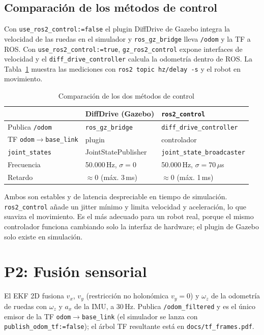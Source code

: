 \documentclass[conference,a4paper]{IEEEtran}
\begin{document}
\subsection{Comparación de los métodos de control}
Con \texttt{use\_ros2\_control:=false} el plugin DiffDrive de Gazebo integra la velocidad de las ruedas en el simulador y \texttt{ros\_gz\_bridge} lleva \texttt{/odom} y la TF a ROS. Con \texttt{use\_ros2\_control:=true}, \texttt{gz\_ros2\_control} expone interfaces de velocidad y el \texttt{diff\_drive\_controller} calcula la odometría dentro de ROS. La Tabla~\ref{tab:p1} muestra las mediciones con \texttt{ros2 topic hz/delay -s} y el robot en movimiento.

\begin{table}[!t]\centering\footnotesize
\caption{Comparación de los dos métodos de control}\label{tab:p1}
\begin{tabularx}{\columnwidth}{lXX}\toprule
 & DiffDrive (Gazebo) & \texttt{ros2\_control} \\\midrule
Publica \texttt{/odom} & \texttt{ros\_gz\_bridge} & \texttt{diff\_drive\_controller} \\
TF \texttt{odom$\to$base\_link} & plugin & controlador \\
\texttt{joint\_states} & JointStatePublisher & \texttt{joint\_state\_broadcaster} \\
Frecuencia & 50.000\,Hz, $\sigma{=}0$ & 50.000\,Hz, $\sigma{=}70\,\mu$s \\
Retardo & $\approx0$ (máx. 3\,ms) & $\approx0$ (máx. 1\,ms) \\\bottomrule
\end{tabularx}
\end{table}

Ambos son estables y de latencia despreciable en tiempo de simulación. \texttt{ros2\_control} añade un jitter mínimo y limita velocidad y aceleración, lo que suaviza el movimiento. Es el más adecuado para un robot real, porque el mismo controlador funciona cambiando solo la interfaz de hardware; el plugin de Gazebo solo existe en simulación.

\section{P2: Fusión sensorial}
El EKF 2D fusiona $v_x$, $v_y$ (restricción no holonómica $v_y=0$) y $\omega_z$ de la odometría de ruedas con $\omega_z$ y $a_x$ de la IMU, a 30\,Hz. Publica \texttt{/odom\_filtered} y es el único emisor de la TF \texttt{odom$\to$base\_link} (el simulador se lanza con \texttt{publish\_odom\_tf:=false}); el árbol TF resultante está en \texttt{docs/tf\_frames.pdf}.
\end{document}
